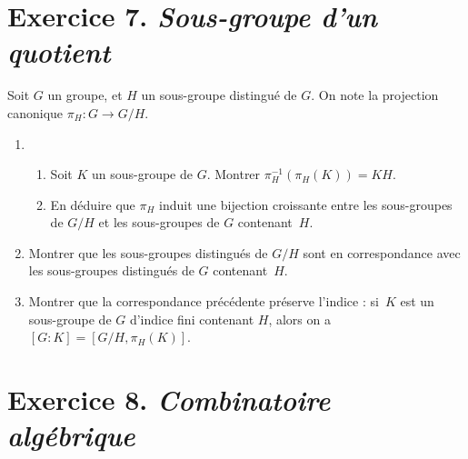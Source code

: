 \documentclass[./main]{subfiles}
\begin{document}
  \section{Exercice 7. \textit{Sous-groupe d'un quotient}}
  \begin{enonce}
    Soit $G$ un groupe, et $H$ un sous-groupe distingué de $G$. On note la projection canonique $\pi_H : G \to G/H$.
    \begin{enumerate}
      \item
        \begin{enumerate}
          \item Soit $K$ un sous-groupe de $G$. Montrer $\pi_H^{-1}(\pi_H(K)) = K H$.
          \item En déduire que $\pi_H$ induit une bijection croissante entre les sous-groupes de $G / H$ et les sous-groupes de $G$ contenant~$H$.
        \end{enumerate}
      \item Montrer que les sous-groupes distingués de $G / H$ sont en correspondance avec les sous-groupes distingués de $G$ contenant~$H$.
      \item Montrer que la correspondance précédente préserve l'indice : si~$K$ est un sous-groupe de $G$ d'indice fini contenant $H$, alors on a $[G : K] = [G/H, \pi_H(K)]$.
    \end{enumerate}
  \end{enonce}

  \section{Exercice 8. \textit{Combinatoire algébrique}}
\end{document}
